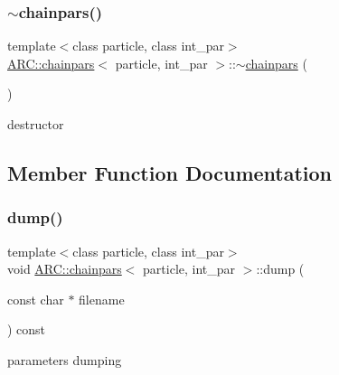 \hypertarget{classARC_1_1chainpars_a845a35853f213671423ace05aad18176}{}\label{classARC_1_1chainpars_a845a35853f213671423ace05aad18176} 
\subsubsection{\texorpdfstring{$\sim$chainpars()}{~chainpars()}}
{\footnotesize\ttfamily template$<$class particle, class int\+\_\+par$>$ \\
\hyperlink{classARC_1_1chainpars}{A\+R\+C\+::chainpars}$<$ particle, int\+\_\+par $>$\+::$\sim$\hyperlink{classARC_1_1chainpars}{chainpars} (\begin{DoxyParamCaption}{ }\end{DoxyParamCaption})\hspace{0.3cm}{\ttfamily [inline]}}



destructor 



\subsection{Member Function Documentation}
\hypertarget{classARC_1_1chainpars_aa74f5c25fdd13f5bccc4efbee672dd44}{}\label{classARC_1_1chainpars_aa74f5c25fdd13f5bccc4efbee672dd44} 
\subsubsection{\texorpdfstring{dump()}{dump()}}
{\footnotesize\ttfamily template$<$class particle, class int\+\_\+par$>$ \\
void \hyperlink{classARC_1_1chainpars}{A\+R\+C\+::chainpars}$<$ particle, int\+\_\+par $>$\+::dump (\begin{DoxyParamCaption}\item[{const char $\ast$}]{filename }\end{DoxyParamCaption}) const\hspace{0.3cm}{\ttfamily [inline]}}



parameters dumping 


